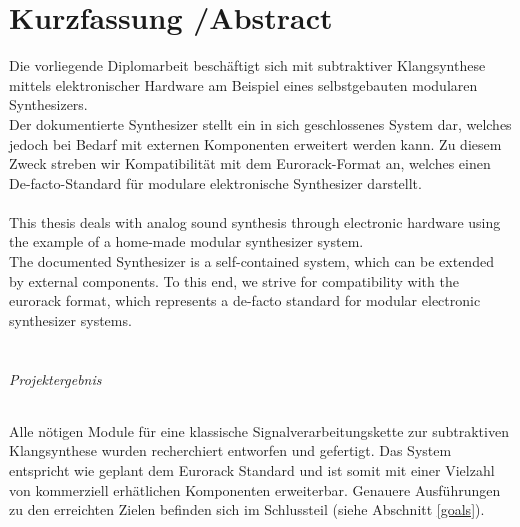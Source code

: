 \chapter*{Kurzfassung /Abstract }
\label{cha:abstract}

Die vorliegende Diplomarbeit beschäftigt sich mit subtraktiver Klangsynthese mittels elektronischer Hardware am Beispiel eines selbstgebauten modularen Synthesizers. \\

Der dokumentierte Synthesizer stellt ein in sich geschlossenes System dar, welches jedoch bei Bedarf mit externen Komponenten erweitert werden kann. Zu diesem Zweck streben wir Kompatibilität mit dem Eurorack-Format an, welches einen De-facto-Standard für modulare elektronische Synthesizer darstellt. \\ \\


This thesis deals with analog sound synthesis through electronic hardware using the example of a home-made modular synthesizer system. \\

The documented Synthesizer is a self-contained system, which can be extended by external components. To this end, we strive for compatibility with the eurorack format, which represents a de-facto standard for modular electronic synthesizer systems. \\ \\


\subparagraph{Projektergebnis}
Alle nötigen Module für eine klassische Signalverarbeitungskette zur subtraktiven Klangsynthese wurden recherchiert entworfen und gefertigt. Das System entspricht wie geplant dem Eurorack Standard und ist somit mit einer Vielzahl von kommerziell erhätlichen Komponenten erweiterbar. Genauere Ausführungen zu den erreichten Zielen befinden sich im Schlussteil (siehe Abschnitt \ref{goals}).
